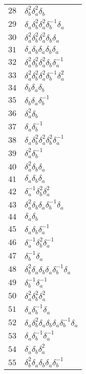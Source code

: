 \documentclass{article}
\begin{document}
\begin{center}
\begin{tabular}{ll}
$28$ & $\delta_b^{2}\delta_a^{2}\delta_b^{}$ \\
$29$ & $\delta_a^{}\delta_b^{2}\delta_a^{2}\delta_b^{-1}\delta_a^{}$ \\
$30$ & $\delta_a^{2}\delta_b^{2}\delta_a^{2}\delta_b^{}\delta_a^{}$ \\
$31$ & $\delta_a^{}\delta_b^{}\delta_a^{}\delta_b^{}\delta_a^{}$ \\
$32$ & $\delta_a^{2}\delta_b^{2}\delta_a^{2}\delta_b^{}\delta_a^{-1}$ \\
$33$ & $\delta_a^{2}\delta_b^{2}\delta_a^{2}\delta_b^{-1}\delta_a^{2}$ \\
$34$ & $\delta_b^{}\delta_a^{}\delta_b^{}$ \\
$35$ & $\delta_b^{}\delta_a^{}\delta_b^{-1}$ \\
$36$ & $\delta_a^{2}\delta_b^{}$ \\
$37$ & $\delta_a^{}\delta_b^{-1}$ \\
$38$ & $\delta_a^{}\delta_b^{2}\delta_a^{2}\delta_b^{2}\delta_a^{-1}$ \\
$39$ & $\delta_a^{2}\delta_b^{-1}$ \\
$40$ & $\delta_a^{2}\delta_b^{}\delta_a^{}$ \\
$41$ & $\delta_a^{}\delta_b^{}\delta_a^{}$ \\
$42$ & $\delta_a^{-1}\delta_b^{2}\delta_a^{2}$ \\
$43$ & $\delta_a^{2}\delta_b^{}\delta_a^{}\delta_b^{-1}\delta_a^{}$ \\
$44$ & $\delta_a^{}\delta_b^{}$ \\
$45$ & $\delta_a^{}\delta_b^{}\delta_a^{-1}$ \\
$46$ & $\delta_a^{-1}\delta_b^{2}\delta_a^{-1}$ \\
$47$ & $\delta_b^{-1}\delta_a^{}$ \\
$48$ & $\delta_b^{2}\delta_a^{}\delta_b^{}\delta_a^{}\delta_b^{-1}\delta_a^{}$ \\
$49$ & $\delta_b^{-1}\delta_a^{-1}$ \\
$50$ & $\delta_a^{2}\delta_b^{2}\delta_a^{2}$ \\
$51$ & $\delta_a^{}\delta_b^{-1}\delta_a^{}$ \\
$52$ & $\delta_a^{}\delta_b^{2}\delta_a^{}\delta_b^{}\delta_a^{}\delta_b^{-1}\delta_a^{}$ \\
$53$ & $\delta_a^{}\delta_b^{-1}\delta_a^{-1}$ \\
$54$ & $\delta_a^{}\delta_b^{}\delta_a^{2}$ \\
$55$ & $\delta_b^{2}\delta_a^{}\delta_b^{}\delta_a^{}\delta_b^{-1}$ \\

\end{tabular}
\end{center}
\end{document}
